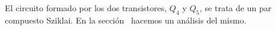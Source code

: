 
\vspace{1.5cm}



El circuito formado por los dos transistores, $Q_{4}$ y $Q_{5}$, se trata de un par compuesto Sziklai. En la sección~ hacemos un análisis del mismo.\\


